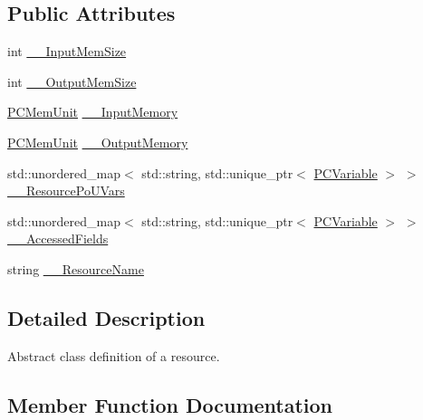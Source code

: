 \subsection*{Public Attributes}
\begin{DoxyCompactItemize}
\item 
int \hyperlink{classpc__emulator_1_1PCResource_afb2356d0dcf4db0b6a04302861a26f18}{\+\_\+\+\_\+\+Input\+Mem\+Size}
\item 
int \hyperlink{classpc__emulator_1_1PCResource_a9b24906c7b1fcaee0ce72018c75bae9f}{\+\_\+\+\_\+\+Output\+Mem\+Size}
\item 
\hyperlink{classpc__emulator_1_1PCMemUnit}{P\+C\+Mem\+Unit} \hyperlink{classpc__emulator_1_1PCResource_a8581fead293ac0f5218bbc4de5241999}{\+\_\+\+\_\+\+Input\+Memory}
\item 
\hyperlink{classpc__emulator_1_1PCMemUnit}{P\+C\+Mem\+Unit} \hyperlink{classpc__emulator_1_1PCResource_aa70b08417c498d378158b048915ff8c0}{\+\_\+\+\_\+\+Output\+Memory}
\item 
std\+::unordered\+\_\+map$<$ std\+::string, std\+::unique\+\_\+ptr$<$ \hyperlink{classpc__emulator_1_1PCVariable}{P\+C\+Variable} $>$ $>$ \hyperlink{classpc__emulator_1_1PCResource_aead21e358bfd79dd6344c34980d51d5c}{\+\_\+\+\_\+\+Resource\+Po\+U\+Vars}
\item 
std\+::unordered\+\_\+map$<$ std\+::string, std\+::unique\+\_\+ptr$<$ \hyperlink{classpc__emulator_1_1PCVariable}{P\+C\+Variable} $>$ $>$ \hyperlink{classpc__emulator_1_1PCResource_acb5216de1a9e614bea458ad69564aa93}{\+\_\+\+\_\+\+Accessed\+Fields}
\item 
string \hyperlink{classpc__emulator_1_1PCResource_a2ef3a8a76df532cdb7d913ee83ff67c8}{\+\_\+\+\_\+\+Resource\+Name}
\end{DoxyCompactItemize}


\subsection{Detailed Description}
Abstract class definition of a resource. 

\subsection{Member Function Documentation}
